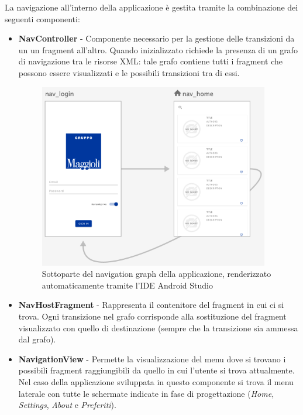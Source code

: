 La navigazione all'interno della applicazione è gestita tramite la combinazione dei seguenti componenti:
\begin{itemize}
    \item \textbf{NavController} - Componente necessario per la gestione delle transizioni da un un fragment all'altro. Quando inizializzato richiede la presenza di un grafo di navigazione tra le risorse XML: tale grafo contiene tutti i fragment che possono essere visualizzati e le possibili transizioni tra di essi.

    \begin{figure}[H]
        \centering
        \includegraphics[width=0.95\textwidth]{img/android-nav-graph.png}
        \caption{Sottoparte del navigation graph della applicazione, renderizzato automaticamente tramite l'IDE Android Studio}
        \label{android-nav-graph-png}
    \end{figure}
    
    \item \textbf{NavHostFragment} - Rappresenta il contenitore del fragment in cui ci si trova. Ogni transizione nel grafo corrisponde alla sostituzione del fragment visualizzato con quello di destinazione (sempre che la transizione sia ammessa dal grafo).
    \item \textbf{NavigationView} - Permette la visualizzazione del menu dove si trovano i possibili fragment raggiungibili da quello in cui l'utente si trova attualmente. Nel caso della applicazione sviluppata in questo componente si trova il menu laterale con tutte le schermate indicate in fase di progettazione (\textit{Home}, \textit{Settings}, \textit{About} e \textit{Preferiti}).
\end{itemize}

